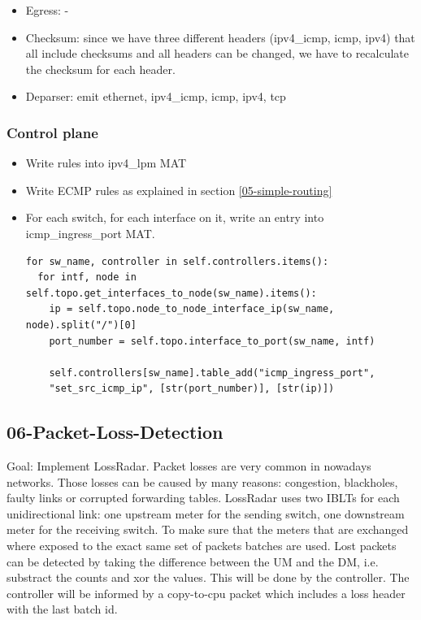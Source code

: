 \documentclass[11pt,oneside,a4paper]{article}
\begin{document}
\begin{itemize}
\begin{itemize}
	\end{itemize}
	\item Egress: -
	\item Checksum: since we have three different headers (ipv4\_icmp, icmp, ipv4) that all include checksums and all headers can be changed, we have to recalculate the checksum for each header.
	\item Deparser: emit ethernet, ipv4\_icmp, icmp, ipv4, tcp
\end{itemize}
\vspace{-\topsep}

\newpage

\subsubsection{Control plane}

\vspace{-\topsep}
\begin{itemize}
	\setlength{\itemsep}{0pt}
	\setlength{\parskip}{0pt}
	\item Write rules into ipv4\_lpm MAT
	\item Write ECMP rules as explained in section \ref{05-simple-routing}
	\item For each switch, for each interface on it, write an entry into icmp\_ingress\_port MAT.
	\vspace{-\topsep}
	\begin{lstlisting}
for sw_name, controller in self.controllers.items():
  for intf, node in self.topo.get_interfaces_to_node(sw_name).items():
    ip = self.topo.node_to_node_interface_ip(sw_name, node).split("/")[0]
    port_number = self.topo.interface_to_port(sw_name, intf)

    self.controllers[sw_name].table_add("icmp_ingress_port", 
    "set_src_icmp_ip", [str(port_number)], [str(ip)])
	\end{lstlisting}
\end{itemize}
\vspace{-\topsep}

\subsection{06-Packet-Loss-Detection}

Goal: Implement LossRadar. Packet losses are very common in nowadays networks. Those losses can be caused by many reasons: congestion, blackholes, faulty links or corrupted forwarding tables. LossRadar uses two IBLTs for each unidirectional link: one upstream meter for the sending switch, one downstream meter for the receiving switch. To make sure that the meters that are exchanged where exposed to the exact same set of packets batches are used. Lost packets can be detected by taking the difference between the UM and the DM, i.e. substract the counts and xor the values. This will be done by the controller. The controller will be informed by a copy-to-cpu packet which includes a loss header with the last batch id.
\end{document}

